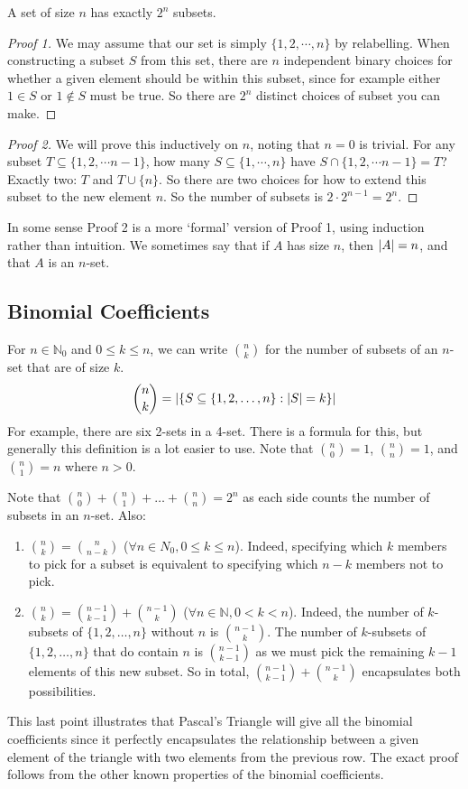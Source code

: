 \begin{proposition}
	A set of size \(n\) has exactly \(2^n\) subsets.
\end{proposition}
\begin{proof}[Proof 1]
	We may assume that our set is simply \(\{ 1, 2, \cdots, n \}\) by relabelling. When constructing a subset \(S\) from this set, there are \(n\) independent binary choices for whether a given element should be within this subset, since for example either \(1 \in S\) or \(1 \notin S\) must be true. So there are \(2^n\) distinct choices of subset you can make.
\end{proof}
\begin{proof}[Proof 2]
	We will prove this inductively on \(n\), noting that \(n=0\) is trivial. For any subset \(T \subseteq \{ 1, 2, \cdots n-1 \}\), how many \(S \subseteq \{ 1, \cdots, n \}\) have \(S \cap \{ 1, 2, \cdots n-1 \} = T\)? Exactly two: \(T\) and \(T \cup \{ n \}\). So there are two choices for how to extend this subset to the new element \(n\). So the number of subsets is \(2 \cdot 2^{n-1} = 2^n\).
\end{proof}
\noindent In some sense Proof 2 is a more `formal' version of Proof 1, using induction rather than intuition. We sometimes say that if \(A\) has size \(n\), then \(\abs{A} = n\), and that \(A\) is an \(n\)-set.

\subsection{Binomial Coefficients}
For \(n \in \mathbb N_0\) and \(0 \leq k \leq n\), we can write \(\binom{n}{k}\) for the number of subsets of an \(n\)-set that are of size \(k\).
\[ \binom{n}{k} = \abs{\left\{ S \subseteq \{ 1, 2, \dots, n \}: \abs{S} = k \right\}} \]
For example, there are six 2-sets in a 4-set. There is a formula for this, but generally this definition is a lot easier to use. Note that \(\binom{n}{0} = 1\), \(\binom{n}{n} = 1\), and \(\binom{n}{1}=n\) where \(n>0\).

Note that \(\binom{n}{0} + \binom{n}{1} + \dots + \binom{n}{n} = 2^n\) as each side counts the number of subsets in an \(n\)-set. Also:
\begin{enumerate}
	\item \(\binom{n}{k} = \binom{n}{n-k}\) (\(\forall n \in N_0, 0 \leq k \leq n\)). Indeed, specifying which \(k\) members to pick for a subset is equivalent to specifying which \(n-k\) members not to pick.
	\item \(\binom{n}{k} = \binom{n-1}{k-1} + \binom{n-1}{k}\) (\(\forall n \in \mathbb N, 0 < k < n\)). Indeed, the number of \(k\)-subsets of \(\{ 1, 2, \dots, n \}\) without \(n\) is \(\binom{n-1}{k}\). The number of \(k\)-subsets of \(\{ 1, 2, \dots, n \}\) that do contain \(n\) is \(\binom{n-1}{k-1}\) as we must pick the remaining \(k-1\) elements of this new subset. So in total, \(\binom{n-1}{k-1} + \binom{n-1}{k}\) encapsulates both possibilities.
\end{enumerate}
This last point illustrates that Pascal's Triangle will give all the binomial coefficients since it perfectly encapsulates the relationship between a given element of the triangle with two elements from the previous row. The exact proof follows from the other known properties of the binomial coefficients.
